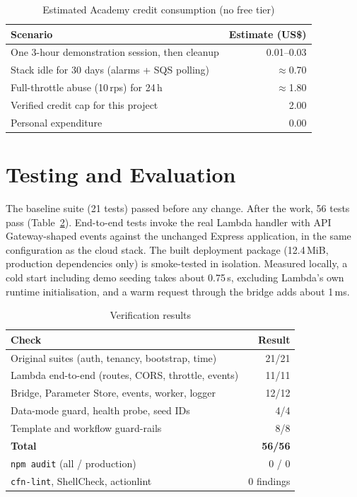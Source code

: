 \documentclass[conference]{IEEEtran}
\newcommand{\code}[1]{\texttt{\small #1}}
\begin{document}
\begin{table}[t]
\caption{Estimated Academy credit consumption (no free tier)}
\label{tab:cost}
\centering
\footnotesize
\begin{tabularx}{\columnwidth}{@{}Xr@{}}
\toprule
Scenario & Estimate (US\$) \\
\midrule
One 3-hour demonstration session, then cleanup & 0.01--0.03 \\
Stack idle for 30 days (alarms + SQS polling) & $\approx$0.70 \\
Full-throttle abuse (10\,rps) for 24\,h & $\approx$1.80 \\
Verified credit cap for this project & 2.00 \\
Personal expenditure & 0.00 \\
\bottomrule
\end{tabularx}
\end{table}

\section{Testing and Evaluation}
The baseline suite (21 tests) passed before any change. After the work, 56 tests pass
(Table~\ref{tab:tests}). End-to-end tests invoke the real Lambda handler with
API Gateway-shaped events against the unchanged Express application, in the same
configuration as the cloud stack. The built deployment package (12.4\,MiB, production
dependencies only) is smoke-tested in isolation. Measured locally, a cold start including
demo seeding takes about 0.75\,s, excluding Lambda's own runtime initialisation, and a warm
request through the bridge adds about 1\,ms.

\begin{table}[t]
\caption{Verification results}
\label{tab:tests}
\centering
\footnotesize
\begin{tabularx}{\columnwidth}{@{}Xr@{}}
\toprule
Check & Result \\
\midrule
Original suites (auth, tenancy, bootstrap, time) & 21/21 \\
Lambda end-to-end (routes, CORS, throttle, events) & 11/11 \\
Bridge, Parameter Store, events, worker, logger & 12/12 \\
Data-mode guard, health probe, seed IDs & 4/4 \\
Template and workflow guard-rails & 8/8 \\
\textbf{Total} & \textbf{56/56} \\
\code{npm audit} (all / production) & 0 / 0 \\
\code{cfn-lint}, ShellCheck, actionlint & 0 findings \\
\bottomrule
\end{tabularx}
\end{table}
\end{document}
